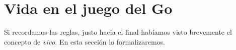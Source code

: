 %	
%	
\section{Vida en el juego del Go}
\label{sec-vida}
Si recordamos las reglas, justo hacia el final habíamos visto brevemente el concepto de \textit{vivo}. En esta sección lo formalizaremos.


